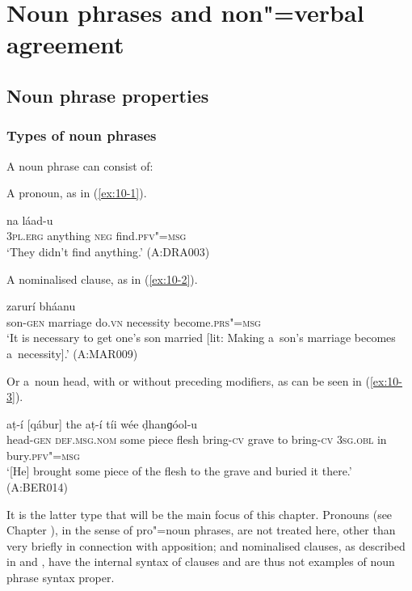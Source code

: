 \chapter{Noun phrases and non"=verbal agreement}
\label{chap:10}


\section{Noun phrase properties}
\label{sec:10-1}

\subsection{Types of noun phrases}
\label{subsec:10-1-1}


A noun phrase can consist of: 


A pronoun, as in (\ref{ex:10-1}).

\begin{exe}
\ex
\label{ex:10-1}
\gll [taním] [ɡa] na láad-u  \\
\textsc{3pl.erg} anything \textsc{neg} find.\textsc{pfv"=msg} \\
\glt `They didn't find anything.' (A:DRA003)
\end{exe}

A nominalised clause, as in (\ref{ex:10-2}).

\begin{exe}
\ex
\label{ex:10-2}
 zarurí bháanu \\
son-\textsc{gen} marriage do.\textsc{vn} necessity become.\textsc{prs"=msg}  \\
\glt `It is necessary to get one's son married [lit: Making a~son's marriage becomes a~necessity].' (A:MAR009)
\end{exe}

Or a~noun head, with or without preceding modifiers, as can be seen in (\ref{ex:10-3}).

\begin{exe}
\ex
\label{ex:10-3}
 aṭ-í [qábur] the aṭ-í tíi wée ḍhanɡóol-u \\
head-\textsc{gen} \textsc{def.msg.nom} some piece flesh bring-\textsc{cv} grave  to bring-\textsc{cv} \textsc{3sg.obl} in bury.\textsc{pfv"=msg}  \\
\glt `[He] brought some piece of the flesh to the grave and buried it there.' (A:BER014)
\end{exe}

It is the latter type that will be the main focus of this chapter. Pronouns (see Chapter ), in the sense of pro"=noun phrases, are not treated here, other than very briefly in connection with apposition; and nominalised clauses, as described in  and , have the internal syntax of clauses and are thus not examples of noun phrase syntax proper. 


